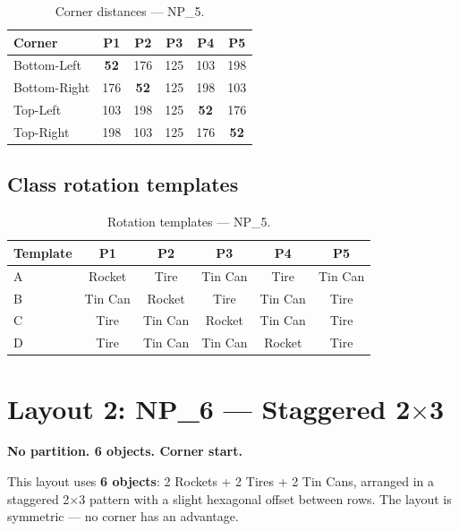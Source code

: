 \documentclass[a4]{article}
\begin{document}
\begin{table}[H]
\centering
\begin{tabular}{lccccc}
\toprule
\textbf{Corner} & \textbf{P1} & \textbf{P2} & \textbf{P3} & \textbf{P4} & \textbf{P5} \\
\midrule
Bottom-Left & \textbf{52} & 176 & 125 & 103 & 198 \\
Bottom-Right & 176 & \textbf{52} & 125 & 198 & 103 \\
Top-Left & 103 & 198 & 125 & \textbf{52} & 176 \\
Top-Right & 198 & 103 & 125 & 176 & \textbf{52} \\
\bottomrule
\end{tabular}
\caption{Corner distances --- NP\_5.}
\end{table}

\subsection*{Class rotation templates}

\begin{table}[H]
\centering
\begin{tabular}{lccccc}
\toprule
\textbf{Template} & \textbf{P1} & \textbf{P2} & \textbf{P3} & \textbf{P4} & \textbf{P5} \\
\midrule
A & Rocket & Tire & Tin Can & Tire & Tin Can \\
B & Tin Can & Rocket & Tire & Tin Can & Tire \\
C & Tire & Tin Can & Rocket & Tin Can & Tire \\
D & Tire & Tin Can & Tin Can & Rocket & Tire \\
\bottomrule
\end{tabular}
\caption{Rotation templates --- NP\_5.}
\end{table}

\pagebreak
\section*{Layout 2: NP\_6 --- Staggered 2$\times$3}

\textbf{No partition. 6 objects. Corner start.}

This layout uses \textbf{6 objects}: 2 Rockets + 2 Tires + 2 Tin Cans, arranged in a staggered 2$\times$3 pattern with a slight hexagonal offset between rows. The layout is symmetric --- no corner has an advantage.
\end{document}
